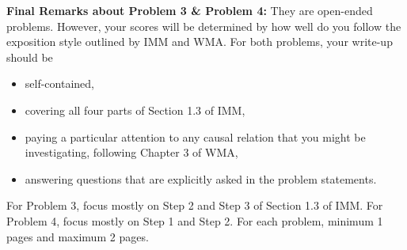 \documentclass[12pt]{article}
\begin{document}
\newpage
\vskip0.25in
\noindent\textbf{Final Remarks about Problem 3 \& Problem 4:} 
They are open-ended problems.  However, your scores will be determined
by how well do you follow the exposition style outlined by IMM and
WMA.  For both problems, your write-up should be 
\begin{itemize}
\item self-contained,
\item covering all four parts of Section 1.3 of IMM,
\item paying a particular attention to any causal relation that you
  might be investigating, following Chapter 3 of WMA,
\item answering questions that are explicitly asked in the problem statements.
\end{itemize}
For Problem 3, focus mostly on Step 2 and Step 3 of Section
1.3 of IMM.  For Problem 4, focus mostly on Step 1 and Step
2.  For each problem, minimum 1 pages and maximum 2 pages.
\end{document}
